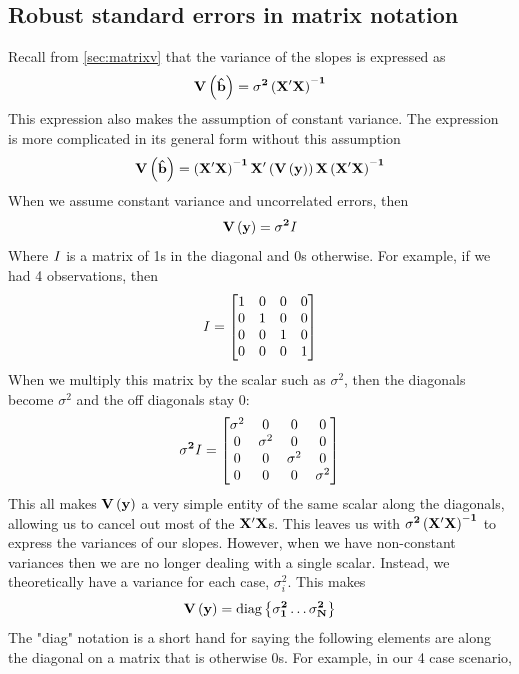 \subsection{Robust standard errors in matrix notation}
\label{sec:robustmatrix}
Recall from \ref{sec:matrixv} that the variance of the slopes is expressed as
\[
\bf V\left({\hat{b}}\right)=\sigma^2\left(X'X\right)^{-1}
\]
This expression also makes the assumption of constant variance. The expression is more complicated in its general form without this assumption
\begin{equation}
\bf V\left({\hat{b}}\right)=\left(X'X\right)^{-1}X'\left(V\left(y\right)\right)X\left(X'X\right)^{-1}
\end{equation}
When we assume constant variance and uncorrelated errors, then
\begin{equation}
\bf V\left(y\right)=\sigma^2 \it I
\end{equation}
Where $\bf \it I$ is a matrix of 1s in the diagonal and 0s otherwise. For example, if we had 4 observations, then
\[
\bf \it I =
\begin{bmatrix}
1&0&0&0 \\
0&1&0&0 \\
0&0&1&0 \\
0&0&0&1 \\
\end{bmatrix}
\]
When we multiply this matrix by the scalar such as $\sigma^2$, then the diagonals become $\sigma^2$ and the off diagonals stay 0:
\[
\bf \sigma^2\it I =
\begin{bmatrix}
\sigma^2&0&0&0 \\
0&\sigma^2&0&0 \\
0&0&\sigma^2&0 \\
0&0&0&\sigma^2 \\
\end{bmatrix}
\]
This all makes $\bf V\left(y\right)$ a very simple entity of the same scalar along the diagonals, allowing us to cancel out most of the $\bf X'X$s. This leaves us with $\bf \sigma^2\left(X'X\right)^{-1}$ to express the variances of our slopes. However, when we have non-constant variances then we are no longer dealing with a single scalar. Instead, we theoretically have a variance for each case, $\sigma_i^2$. This makes
\begin{equation}
\bf V\left(y\right)=\mbox{diag}\left\{\sigma_1^2\ldots\sigma_N^2\right\}
\end{equation}
The "diag" notation is a short hand for saying the following elements are along the diagonal on a matrix that is otherwise 0s. For example, in our 4 case scenario,
